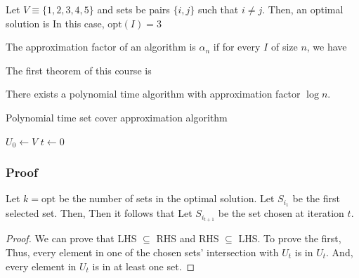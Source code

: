 \begin{example}
    Let $V \equiv \{ 1, 2, 3, 4, 5 \}$ and sets be pairs $\{ i, j \}$ such that $i \ne j$. Then, an optimal solution is
    In this case, $\text{opt}(I) = 3$
\end{example}

\begin{definition}
    The approximation factor of an algorithm is $\alpha_n$ if for every $I$ of size $n$, we have
\end{definition}

The first theorem of this course is
\begin{theorem}
    There exists a polynomial time algorithm with approximation factor $\log n$.

    \begin{algorithm}[H]
        \caption{Polynomial time set cover approximation algorithm}
        \DontPrintSemicolon
        $U_0 \leftarrow V$ 
        $t \leftarrow 0$ 
    \end{algorithm}
\end{theorem}

\subsubsection{Proof}
Let $k = \text{opt}$ be the number of sets in the optimal solution. Let $S_{i_1}$ be the first selected set. Then,
Then it follows that
Let $S_{i_{t+1}}$ be the set chosen at iteration $t$.
\begin{lemma}
\end{lemma}
\begin{proof}
    We can prove that LHS $\subseteq$ RHS and RHS $\subseteq$ LHS. To prove the first,
    Thus, every element in one of the chosen sets' intersection with $U_t$ is in $U_t$.
    And, every element in $U_t$ is in at least one set.
\end{proof}

